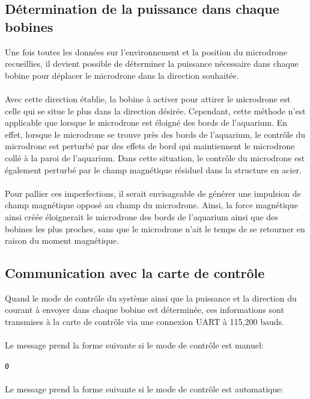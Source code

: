 \documentclass{article}
\begin{document}
    \subsection{Détermination de la puissance dans chaque bobines}

Une fois toutes les données sur l'environnement et la position du microdrone recueillies, il devient possible de déterminer la puissance nécessaire dans chaque bobine pour déplacer le microdrone dans la direction souhaitée.
        \\\\
        Avec cette direction établie, la bobine à activer pour attirer le microdrone est celle qui se situe le plus dans la direction désirée. Cependant, cette méthode n'est applicable que lorsque le microdrone est éloigné des bords de l'aquarium. En effet, lorsque le microdrone se trouve près des bords de l'aquarium, le contrôle du microdrone est perturbé par des effets de bord qui maintiennent le microdrone collé à la paroi de l'aquarium. Dans cette situation, le contrôle du microdrone est également perturbé par le champ magnétique résiduel dans la structure en acier.
        \\\\
       Pour pallier ces imperfections, il serait envisageable de générer une impulsion de champ magnétique opposé au champ du microdrone. Ainsi, la force magnétique ainsi créée éloignerait le microdrone des bords de l'aquarium ainsi que des bobines les plus proches, sans que le microdrone n'ait le temps de se retourner en raison du moment magnétique.
       
    \subsection{Communication avec la carte de contrôle}
        Quand le mode de contrôle du système ainsi que la puissance et la direction du courant à envoyer dans chaque bobine est déterminée, ces informations sont transmises à la carte de contrôle via une connexion UART à 115,200 bauds.
        \\\\
        Le message prend la forme suivante si le mode de contrôle est manuel:

        \tabto{1cm}\verb+0+
        \\\\
        Le message prend la forme suivante si le mode de contrôle est automatique:
        
\end{document}
